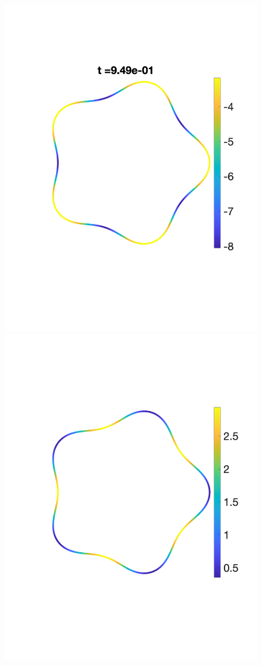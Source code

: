 \documentclass[9pt,twocolumn,twoside,lineno]{pnas-new}
\begin{document}
\begin{figure}[htp]
  \includegraphics[width=0.48\linewidth,trim =2cm 5cm 0cm 5cm, clip=true]{figures/StarTensionTime4.pdf}
  \includegraphics[width=0.48\linewidth,trim =2cm 5cm 0cm 5cm, clip=true]{figures/StarFluxTime4.pdf}


\end{figure}
\end{document}
